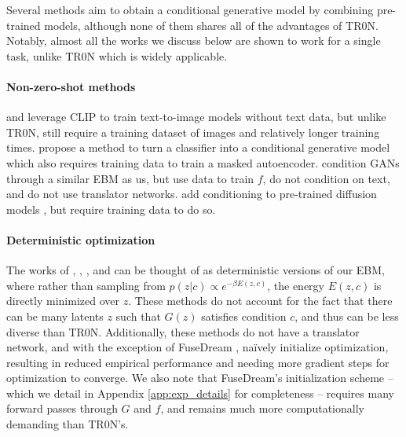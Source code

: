 \documentclass[nohyperref]{article}
\theoremstyle{plain}
\theoremstyle{definition}
\theoremstyle{remark}
\begin{document}
Several methods aim to obtain a conditional generative model by combining pre-trained models, although none of them shares all of the advantages of TR0N. 
Notably, almost all the works we discuss below are shown to work for a single task, unlike TR0N which is widely applicable.

\paragraph{Non-zero-shot methods} \citet{Zhou2021TowardsLT} and \citet{Wang2022CLIPGENLT} leverage CLIP to train text-to-image models without text data, but unlike TR0N, still require a training dataset of images and relatively longer training times. \citet{wang2022traditional} propose a method to turn a classifier into a conditional generative model which also requires training data to train a masked autoencoder. \citet{nie2021controllable} condition GANs through a similar EBM as us, but use data to train $f$, do not condition on text, and do not use translator networks. \citet{zhang2023adding} add conditioning to pre-trained diffusion models \citep{ho2020denoising}, but require training data to do so.

\paragraph{Deterministic optimization} The works of \citet{nguyen2016synthesizing}, \citet{liu2021fusedream}, \citet{patashnik2021styleclip}, and \citet{li2022composing} can be thought of as deterministic versions of our EBM, where rather than sampling from $p(z|c) \propto e^{-\beta E(z,c)}$, the energy $E(z, c)$ is directly minimized over $z$. These methods do not account for the fact that there can be many latents $z$ such that $G(z)$ satisfies condition $c$, and thus can be less diverse than TR0N. Additionally, these methods do not have a translator network, and with the exception of FuseDream \citep{liu2021fusedream}, na\"ively initialize optimization, resulting in reduced empirical performance and needing more gradient steps for optimization to converge. We also note that FuseDream's initialization scheme -- which we detail in Appendix \ref{app:exp_details} for completeness -- requires many forward passes through $G$ and $f$, and remains much more computationally demanding than TR0N's.
\end{document}
